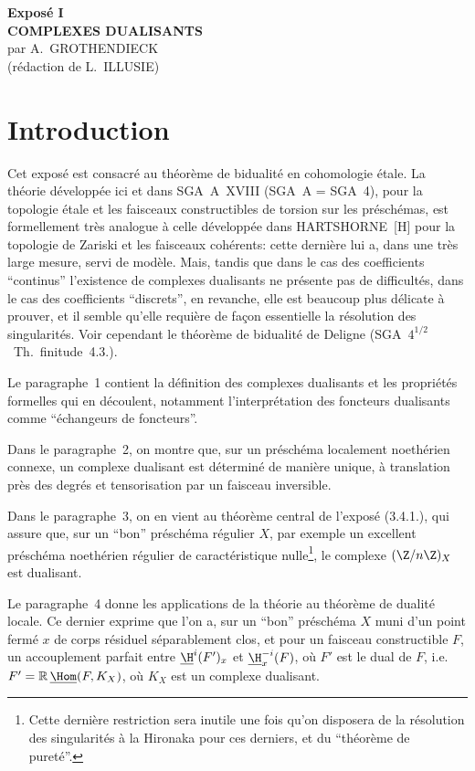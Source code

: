 

\begin{center}
{\Large \textbf{Exposé I}}\\[0.4em]
{\large \textbf{COMPLEXES DUALISANTS}}\\[0.3em]
par A.~GROTHENDIECK\\
(rédaction de L.~ILLUSIE)
\end{center}

\section*{Introduction}

Cet exposé est consacré au théorème de bidualité en cohomologie étale. La théorie développée ici et dans SGA~A~XVIII (SGA~A = SGA~4), pour la topologie étale et les faisceaux constructibles de torsion sur les préschémas, est formellement très analogue à celle développée dans HARTSHORNE~[H] pour la topologie de Zariski et les faisceaux cohérents: cette dernière lui a, dans une très large mesure, servi de modèle. Mais, tandis que dans le cas des coefficients ``continus'' l'existence de complexes dualisants ne présente pas de difficultés, dans le cas des coefficients ``discrets'', en revanche, elle est beaucoup plus délicate à prouver, et il semble qu'elle requière de façon essentielle la résolution des singularités. Voir cependant le théorème de bidualité de Deligne (SGA~$4^{1/2}$~Th.~finitude~4.3.).

Le paragraphe~1 contient la définition des complexes dualisants et les propriétés formelles qui en découlent, notamment l'interprétation des foncteurs dualisants comme ``échangeurs de foncteurs''.

Dans le paragraphe~2, on montre que, sur un préschéma localement noethérien connexe, un complexe dualisant est déterminé de manière unique, à translation près des degrés et tensorisation par un faisceau inversible.

Dans le paragraphe~3, on en vient au théorème central de l'exposé (3.4.1.), qui assure que, sur un ``bon'' préschéma régulier $X$, par exemple un excellent préschéma noethérien régulier de caractéristique nulle\footnote{Cette dernière restriction sera inutile une fois qu'on disposera de la résolution des singularités à la Hironaka pour ces derniers, et du ``théorème de pureté''.}, le complexe $(\Z/n\Z)_X$ est dualisant.

Le paragraphe~4 donne les applications de la théorie au théorème de dualité locale. Ce dernier exprime que l'on a, sur un ``bon'' préschéma $X$ muni d'un point fermé $x$ de corps résiduel séparablement clos, et pour un faisceau constructible $F$, un accouplement parfait entre $\underline{\H}^i(F')_x$ et $\underline{\H}^{-i}_x(F)$, où $F'$ est le dual de $F$, i.e.\ $F' = \mathbb{R}\,\underline{\Hom}(F,K_X)$, où $K_X$ est un complexe dualisant.

